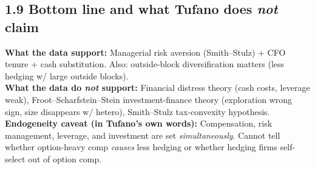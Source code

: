 \documentclass[11pt]{article}
\begin{document}
\subsection*{1.9 Bottom line and what Tufano does \emph{not} claim}
\begin{keybox}
\textbf{What the data support:} Managerial risk aversion (Smith--Stulz) + CFO tenure + cash substitution. Also: outside-block diversification matters (less hedging w/ large outside blocks).\\[1pt]
\textbf{What the data do \emph{not} support:} Financial distress theory (cash costs, leverage weak), Froot--Scharfstein--Stein investment-finance theory (exploration wrong sign, size disappears w/ hetero), Smith--Stulz tax-convexity hypothesis.\\[1pt]
\textbf{Endogeneity caveat (in Tufano's own words):} Compensation, risk management, leverage, and investment are set \emph{simultaneously}. Cannot tell whether option-heavy comp \emph{causes} less hedging or whether hedging firms self-select out of option comp.
\end{keybox}

\newpage
\end{document}

